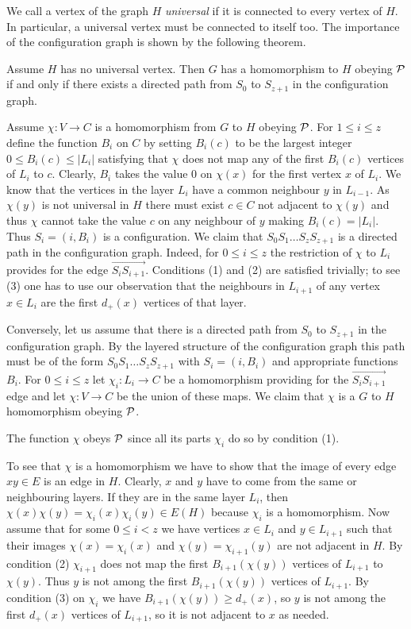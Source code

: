 \documentclass[12pt]{llncs}
\begin{document}
We call a vertex of the graph $H$ \emph{universal} if it is connected to every
vertex of $H$. In particular, a universal vertex must be connected to itself
too. The importance of the configuration graph is shown by the following
theorem.

\begin{theorem}\label{path}
Assume $H$ has no universal vertex. Then $G$ has a homomorphism to $H$ obeying
$\cal P$ if and only if there exists a directed path from $S_0$ to $S_{z+1}$
in the configuration graph.
\end{theorem}

\begin{my_proof}
Assume $\chi:V\to C$ is a homomorphism from $G$ to $H$ obeying $\cal P$. For
$1\le i
\le z$ define the function $B_i$ on $C$ by setting $B_i(c)$ to be the largest
integer $0\le B_i(c)\le|L_i|$ satisfying that $\chi$ does not map any of the
first $B_i(c)$ vertices of $L_i$ to $c$. Clearly, $B_i$ takes the value $0$ on
$\chi(x)$ for
the first vertex $x$ of $L_i$. We know that the vertices in the layer $L_i$
have a common neighbour $y$ in $L_{i-1}$. As $\chi(y)$ is not universal in $H$
there must exist $c\in C$ not adjacent to $\chi(y)$ and thus $\chi$ cannot
take the value $c$ on any neighbour of $y$ making $B_i(c)=|L_i|$. Thus
$S_i=(i,B_i)$ is a configuration. We
claim that $S_0S_1\ldots S_zS_{z+1}$ is a directed path in the
configuration graph. Indeed, for $0\le i\le z$ the restriction of
$\chi$ to $L_i$ provides for the edge
$\overrightarrow{S_iS_{i+1}}$. Conditions (1) and (2) are satisfied
trivially; to see (3) one has to use our observation that the
neighbours in $L_{i+1}$ of any vertex $x\in L_i$ are the first
$d_+(x)$ vertices of that layer.

Conversely, let us assume that there is a directed path from $S_0$ to
$S_{z+1}$ in the configuration graph. By the layered structure of the
configuration graph this path must be of the form
$S_0S_1\ldots S_zS_{z+1}$ with $S_i=(i,B_i)$ and appropriate
functions $B_i$. For $0\le i\le z$ let $\chi_i:L_i\to C$ be a homomorphism
providing for the $\overrightarrow{S_iS_{i+1}}$ edge and let
$\chi: V\to C$ be the union of these maps. We claim that $\chi$ is a $G$ to
$H$ homomorphism obeying $\cal P$.

The function $\chi$ obeys $\cal P$ since all its parts $\chi_i$ do so by
condition (1).

To see that $\chi$ is a homomorphism we have to show that the image of every edge
$xy\in E$ is an edge in $H$. Clearly, $x$ and $y$ have to come from the same
or neighbouring layers. If they are in the same layer $L_i$, then
$\chi(x)\chi(y)=\chi_i(x)\chi_i(y)\in E(H)$ because $\chi_i$ is a
homomorphism. Now assume that for some $0\le i<z$ we have
vertices $x\in L_i$ and $y\in L_{i+1}$ such that their images
$\chi(x)=\chi_i(x)$ and $\chi(y)=\chi_{i+1}(y)$ are not adjacent in $H$. By
condition (2) $\chi_{i+1}$ does not map the first $B_{i+1}(\chi(y))$ vertices
of $L_{i+1}$ to $\chi(y)$. Thus $y$ is not among the first $B_{i+1}(\chi(y))$
vertices of $L_{i+1}$. By condition (3) on $\chi_i$ we have
$B_{i+1}(\chi(y))\ge d_+(x)$, so $y$ is not among the first $d_+(x)$ vertices
of $L_{i+1}$, so it is not adjacent to $x$ as needed.
\end{my_proof}
\end{document}
